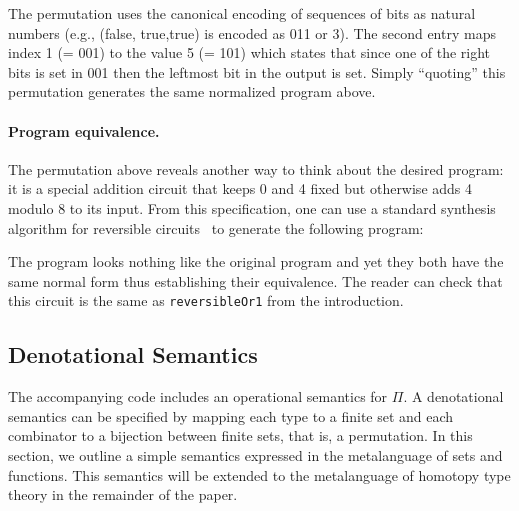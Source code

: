 \noindent The permutation uses the canonical encoding of sequences of bits as natural numbers (e.g., (\textsf{false},
\textsf{true},\textsf{true}) is encoded as 011 or 3).  The second entry maps index 1 (= 001) to the value 5 (= 101)
which states that since one of the right bits is set in 001 then the leftmost bit in the output is set. Simply
``quoting'' this permutation generates the same normalized program  above.

\paragraph*{Program equivalence.} The permutation above reveals another way to think about the desired program: it is a
special addition circuit that keeps 0 and 4 fixed but otherwise adds 4 modulo 8 to its input. From this specification,
one can use a standard synthesis algorithm for reversible circuits~\cite{10.1145/775832.775915} to generate the
following program:

\adder{}

\noindent The  program looks nothing like the original  program and yet they both have the
same normal form thus establishing their equivalence. The reader can check that this circuit is the same as
\verb|reversibleOr1| from the introduction.







\subsection{Denotational Semantics}

\noindent The accompanying code includes an operational semantics for $\Pi$. A denotational semantics can be
specified by mapping each type to a finite set and each combinator to a bijection between finite sets, that is, a
permutation. In this section, we outline a simple semantics expressed in the metalanguage of sets and functions. This
semantics will be extended to the metalanguage of homotopy type theory in the remainder of the paper.

